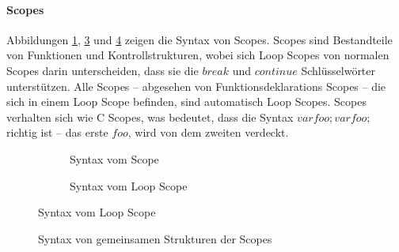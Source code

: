       \paragraph{Scopes}
        Abbildungen \ref{fig:scopesyntax}, \ref{fig:loopscopesyntax} und \ref{fig:commonsyntax} zeigen die Syntax von Scopes. Scopes sind Bestandteile von Funktionen und Kontrollstrukturen, wobei sich Loop Scopes von normalen Scopes darin unterscheiden, dass sie die \myMIn$break$ und \myMIn$continue$ Schlüsselwörter unterstützen. Alle Scopes -- abgesehen von Funktionsdeklarations Scopes -- die sich in einem Loop Scope befinden, sind automatisch Loop Scopes. Scopes verhalten sich wie C Scopes, was bedeutet, dass die Syntax \myMIn$var foo; {var foo;}$ richtig ist -- das erste \myMIn$foo$, wird von dem zweiten verdeckt.
        \begin{figure}[H]
          \vspace*{-\baselineskip}
          \centering
          \begin{minipage}{.45\linewidth}
            \vspace*{4.8em}
            \begin{figure}[H]
              \centering
              \caption{Syntax vom Scope}
              \label{fig:scopesyntax}
            \end{figure}
          \end{minipage}%
          \begin{minipage}{.45\linewidth}
            \begin{figure}[H]
              \centering
              \caption{Syntax vom Loop Scope}
              \label{fig:loopscopesyntax}
            \end{figure}
          \end{minipage}
        \end{figure}

        \begin{figure}[H]
          \centering
          \caption{Syntax von gemeinsamen Strukturen der Scopes}
          \label{fig:commonsyntax}
        \end{figure}

